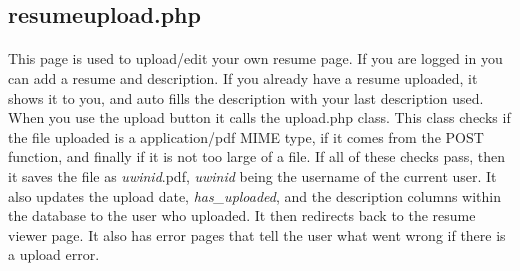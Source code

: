 \documentclass[11pt,letterpaper,titlepage]{article}
\begin{document}
    \subsection{resumeupload.php}
    \paragraph{}
    This page is used to upload/edit your own resume page. If you are logged in
    you can add a resume and description. If you already have a resume uploaded,
    it shows it to you, and auto fills the description with your last
    description used. When you use the upload button it calls the upload.php
    class. This class checks if the file uploaded is a application/pdf MIME
    type, if it comes from the POST function, and finally if it is not too large
    of a file. If all of these checks pass, then it saves the file as
    \emph{uwinid}.pdf, \emph{uwinid} being the username of the current user. It
    also updates the upload date, \emph{has\_uploaded}, and the description
    columns within the database to the user who uploaded. It then redirects back
    to the resume viewer page. It also has error pages that tell the user what
    went wrong if there is a upload error.
\end{document}
